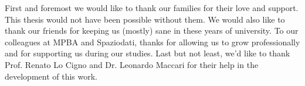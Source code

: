 \newpage \vspace*{8cm}
\thispagestyle{empty}
First and foremost we would like to thank our families for their love and support. This thesis would not have been possible without them.
We would also like to thank our friends for keeping us (mostly) sane in these years of university.
To our colleagues at MPBA and Spaziodati, thanks for allowing us to grow professionally and for supporting us during our studies. 
Last but not least, we'd like to thank Prof. Renato Lo Cigno and Dr. Leonardo Maccari for their help in the development of this work.